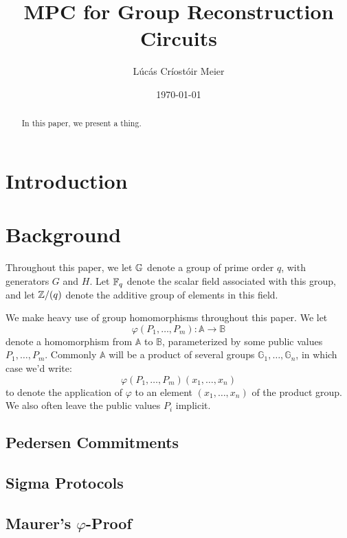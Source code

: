 

\date{\today}
\title{MPC for Group Reconstruction Circuits}
\author{Lúcás Críostóir Meier}



\maketitle

\begin{abstract}
    In this paper, we present a thing.
\end{abstract}

\section{Introduction}


\section{Background}

Throughout this paper, we let $\mathbb{G}$ denote a group of prime order $q$,
with generators $G$ and $H$. Let $\mathbb{F}_q$ denote the scalar field associated
with this group, and let $\mathbb{Z}/(q)$ denote the additive group of elements
in this field.

We make heavy use of group homomorphisms throughout this paper.
We let
$$
\varphi(P_1, \ldots, P_m) : \mathbb{A} \to \mathbb{B}
$$
denote a homomorphism from $\mathbb{A}$ to $\mathbb{B}$, parameterized
by some public values $P_1, \ldots, P_m$. Commonly $\mathbb{A}$
will be a product of several groups $\mathbb{G}_1, \ldots, \mathbb{G}_n$,
in which case we'd write:
$$
\varphi(P_1, \ldots, P_m)(x_1, \ldots, x_n)
$$
to denote the application of $\varphi$ to an element $(x_1, \ldots, x_n)$
of the product group. We also often leave the public values $P_i$ implicit.

\subsection{Pedersen Commitments}

\subsection{Sigma Protocols}

\subsection{Maurer's \texorpdfstring{$\varphi$}{varphi}-Proof}

